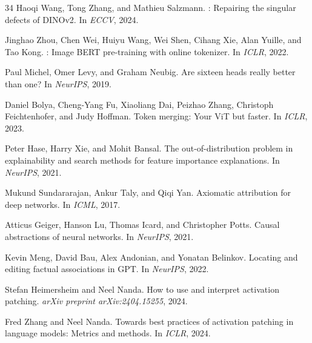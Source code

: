 \documentclass[10pt,twocolumn,letterpaper]{article}
\begin{document}
{\begin{thebibliography}{34}
Haoqi Wang, Tong Zhang, and Mathieu Salzmann.
: Repairing the singular defects of {DINOv2}.
\newblock In \emph{ECCV}, 2024.

Jinghao Zhou, Chen Wei, Huiyu Wang, Wei Shen, Cihang Xie, Alan Yuille, and Tao
  Kong.
: Image {BERT} pre-training with online tokenizer.
\newblock In \emph{ICLR}, 2022.

Paul Michel, Omer Levy, and Graham Neubig.
\newblock Are sixteen heads really better than one?
\newblock In \emph{NeurIPS}, 2019.

Daniel Bolya, Cheng-Yang Fu, Xiaoliang Dai, Peizhao Zhang, Christoph
  Feichtenhofer, and Judy Hoffman.
\newblock Token merging: Your {ViT} but faster.
\newblock In \emph{ICLR}, 2023.

Peter Hase, Harry Xie, and Mohit Bansal.
\newblock The out-of-distribution problem in explainability and search methods
  for feature importance explanations.
\newblock In \emph{NeurIPS}, 2021.

Mukund Sundararajan, Ankur Taly, and Qiqi Yan.
\newblock Axiomatic attribution for deep networks.
\newblock In \emph{ICML}, 2017.

Atticus Geiger, Hanson Lu, Thomas Icard, and Christopher Potts.
\newblock Causal abstractions of neural networks.
\newblock In \emph{NeurIPS}, 2021.

Kevin Meng, David Bau, Alex Andonian, and Yonatan Belinkov.
\newblock Locating and editing factual associations in {GPT}.
\newblock In \emph{NeurIPS}, 2022.

Stefan Heimersheim and Neel Nanda.
\newblock How to use and interpret activation patching.
\newblock \emph{arXiv preprint arXiv:2404.15255}, 2024.

Fred Zhang and Neel Nanda.
\newblock Towards best practices of activation patching in language models:
  Metrics and methods.
\newblock In \emph{ICLR}, 2024.


\end{thebibliography}}
\end{document}
